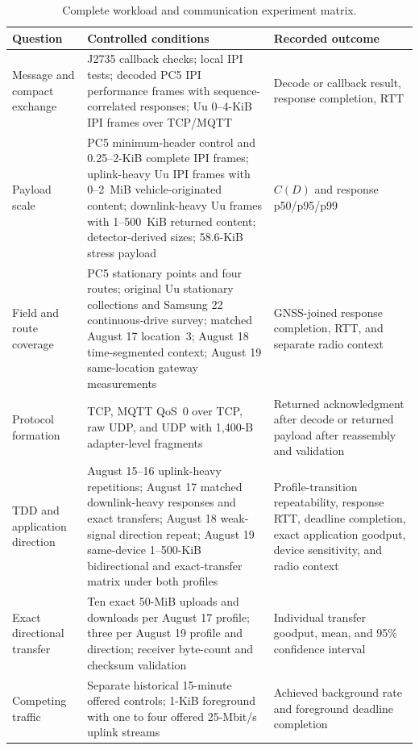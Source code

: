 \begin{table}[t]
  \caption{Complete workload and communication experiment matrix.}
  \label{tab:experiment-matrix}
  \centering
  \scriptsize
  \setlength{\tabcolsep}{2.7pt}
  \begin{tabular}{@{}p{}p{}p{}@{}}
    \toprule
    Question & Controlled conditions & Recorded outcome \\
    \midrule
    Message and compact exchange & J2735 callback checks; local IPI tests; decoded PC5 IPI performance frames with sequence-correlated responses; Uu 0--4-KiB IPI frames over TCP/MQTT & Decode or callback result, response completion, RTT \\
    Payload scale & PC5 minimum-header control and 0.25--2-KiB complete IPI frames; uplink-heavy Uu IPI frames with 0--2~MiB vehicle-originated content; downlink-heavy Uu frames with 1--500~KiB returned content; detector-derived sizes; 58.6-KiB stress payload & $C(D)$ and response p50/p95/p99 \\
    Field and route coverage & PC5 stationary points and four routes; original Uu stationary collections and Samsung 22 continuous-drive survey; matched August 17 location~3; August 18 time-segmented context; August 19 same-location gateway measurements & GNSS-joined response completion, RTT, and separate radio context \\
    Protocol formation & TCP, MQTT QoS~0 over TCP, raw UDP, and UDP with 1,400-B adapter-level fragments & Returned acknowledgment after decode or returned payload after reassembly and validation \\
    TDD and application direction & August 15--16 uplink-heavy repetitions; August 17 matched downlink-heavy responses and exact transfers; August 18 weak-signal direction repeat; August 19 same-device 1--500-KiB bidirectional and exact-transfer matrix under both profiles & Profile-transition repeatability, response RTT, deadline completion, exact application goodput, device sensitivity, and radio context \\
    Exact directional transfer & Ten exact 50-MiB uploads and downloads per August 17 profile; three per August 19 profile and direction; receiver byte-count and checksum validation & Individual transfer goodput, mean, and 95\% confidence interval \\
    Competing traffic & Separate historical 15-minute offered controls; 1-KiB foreground with one to four offered 25-Mbit/s uplink streams & Achieved background rate and foreground deadline completion \\

\end{tabular}
\end{table}
